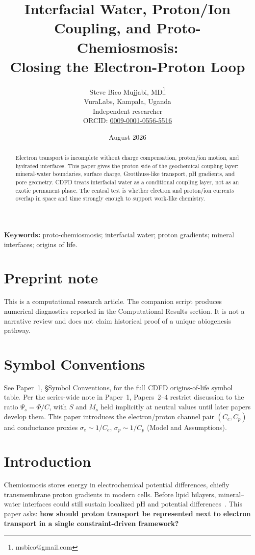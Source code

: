 \documentclass[11pt,a4paper]{article}
\title{Interfacial Water, Proton/Ion Coupling, and Proto-Chemiosmosis:\\ Closing the Electron-Proton Loop}
\author{Steve Bico Mujjabi, MD\thanks{msbico@gmail.com}\\
VuraLabs, Kampala, Uganda\\
Independent researcher\\
ORCID: \href{https://orcid.org/0009-0001-0556-5516}{0009-0001-0556-5516}}
\date{August 2026}
\begin{document}
\maketitle

\begin{abstract}
Electron transport is incomplete without charge compensation, proton/ion motion, and hydrated interfaces. This paper gives the proton side of the geochemical coupling layer: mineral-water boundaries, surface charge, Grotthuss-like transport, pH gradients, and pore geometry. CDFD treats interfacial water as a conditional coupling layer, not as an exotic permanent phase. The central test is whether electron and proton/ion currents overlap in space and time strongly enough to support work-like chemistry.
\end{abstract}

\noindent\textbf{Keywords:} proto-chemiosmosis; interfacial water; proton gradients; mineral interfaces; origins of life.

\section*{Preprint note}
This is a computational research article. The companion script produces numerical diagnostics reported in the Computational Results section. It is not a narrative review and does not claim historical proof of a unique abiogenesis pathway.

\section*{Symbol Conventions}
See Paper~1, \S Symbol Conventions, for the full CDFD origins-of-life symbol table. Per the series-wide note in Paper~1, Papers~2--4 restrict discussion to the ratio $\Psi_s=\Phi/C$, with $S$ and $M_s$ held implicitly at neutral values until later papers develop them. This paper introduces the electron/proton channel pair $(C_e,C_p)$ and conductance proxies $\sigma_e\sim 1/C_e$, $\sigma_p\sim 1/C_p$ (Model and Assumptions).

\section{Introduction}
Chemiosmosis stores energy in electrochemical potential differences, chiefly transmembrane proton gradients in modern cells. Before lipid bilayers, mineral--water interfaces could still sustain localized pH and potential differences~\cite{Lane2010,Martin2007}. This paper asks: \textbf{how should proton transport be represented next to electron transport in a single constraint-driven framework?}
\end{document}
